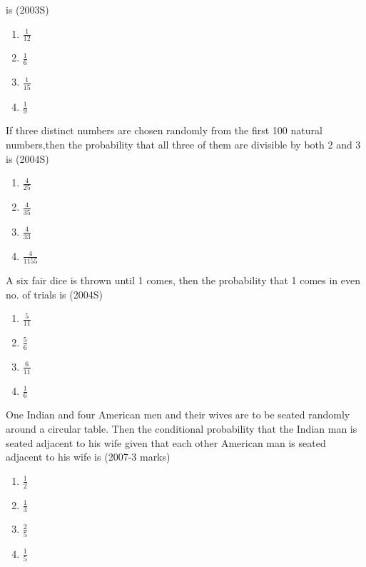 is \hfill (2003S)
\begin{multicols}{4}
\begin{enumerate}
    \item $\frac{1}{12}$
    \item $\frac{1}{6}$
    \item $\frac{1}{15}$
    \item $\frac{1}{9}$
\end{enumerate}
    
\end{multicols}
\item If three distinct numbers are chosen randomly from the first 100 natural numbers,then the probability that all three of them are divisible by both 2 and 3 is \hfill  (2004S)
\begin{multicols}{4}
\begin{enumerate}
\item $\frac{4}{25}$
\item $\frac{4}{35}$
\item $\frac{4}{33}$
\item $\frac{4}{1155}$
\end{enumerate}
    
\end{multicols}
\item A six fair dice is thrown until 1 comes, then the probability that 1 comes in even no. of trials is \hfill (2004S)
\begin{multicols}{4}
\begin{enumerate}
    \item $\frac{5}{11}$
    \item $\frac{5}{6}$
    \item $\frac{6}{11}$
    \item $\frac{1}{6}$
\end{enumerate}
\end{multicols}
\item One Indian and four American men and their wives are to be seated randomly around a circular table. Then the conditional probability that the Indian man is seated adjacent to his wife given that each other American man is seated adjacent to his wife is \hfill(2007-3 marks)
\begin{multicols}{4}
\begin{enumerate}
    \item $\frac{1}{2}$
    \item $\frac{1}{3}$
    \item $\frac{2}{5}$
    \item $\frac{1}{5}$
\end{enumerate}
\end{multicols}
